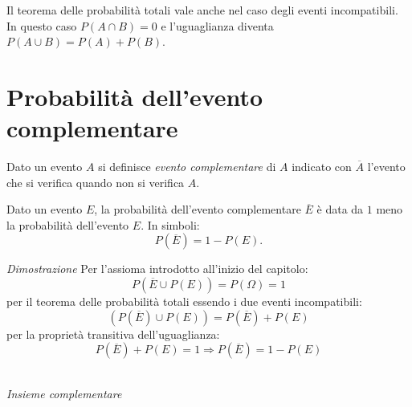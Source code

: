 \osservazione Il teorema delle probabilità totali vale anche nel caso degli 
eventi incompatibili. In questo caso \(P(A\cap B)=0\) e l'uguaglianza diventa 
\(P(A\cup B)=P(A)+P(B)\).


\section{Probabilità dell'evento complementare}
\label{sec:09_complementare}

Dato un evento \(A\) si definisce \emph{evento complementare} di \(A\) 
indicato con \(\overline A\) l'evento che si verifica quando non si verifica 
\(A\).

\begin{teorema}
Dato un evento \(E\), la probabilità dell'evento complementare 
\(\overline E\) è data da \(1\) meno la probabilità dell'evento \(E\). 
In simboli: 
\[ P(\overline E)=1-P(E). \]
\end{teorema}

\begin{minipage}{.59\textwidth}
\emph{Dimostrazione} Per l'assioma introdotto all'inizio del capitolo: 
\[P(\overline E\cup P(E))=P(\Omega )=1\]
per il teorema delle probabilità totali essendo i due eventi incompatibili: 
\[(P(\overline E)\cup P(E))=P(\overline E)+P(E)\]
per la proprietà transitiva dell'uguaglianza: 
\[P(\overline E)+P(E)=1 \Rightarrow P(\overline E)=1-P(E)\]
\end{minipage}
\hfill
\begin{minipage}{.39\textwidth}
\begin{inaccessibleblock}
\begin{center} 
%  
\eventocomplementare \\
\emph{Insieme complementare}
\end{center}
\end{inaccessibleblock}
\end{minipage}



